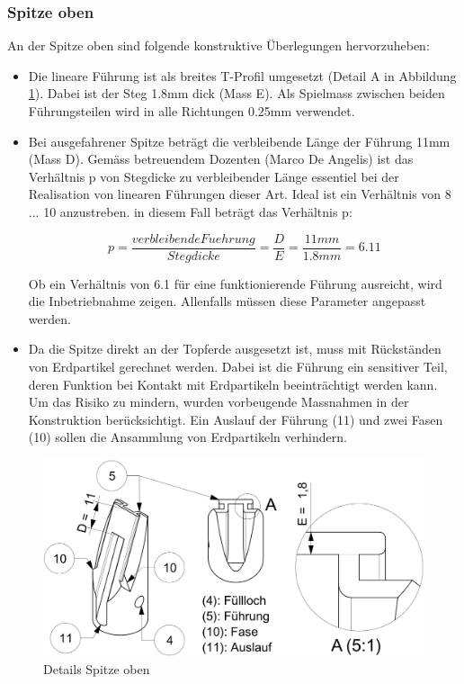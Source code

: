 \subsubsection{Spitze oben}
\label{spitzeoben}
An der Spitze oben sind folgende konstruktive Überlegungen hervorzuheben:
\begin{itemize}
	\item Die lineare Führung ist als breites T-Profil umgesetzt (Detail A in Abbildung \ref{fig:details_spitze_oben}). Dabei ist der Steg 1.8mm dick (Mass E). Als Spielmass zwischen beiden Führungsteilen wird in alle Richtungen 0.25mm verwendet.
	
	\item Bei ausgefahrener Spitze beträgt die verbleibende Länge der Führung 11mm (Mass D). Gemäss betreuendem Dozenten (Marco De Angelis) ist das Verhältnis p von Stegdicke zu verbleibender Länge essentiel bei der Realisation von linearen Führungen dieser Art. Ideal ist ein Verhältnis von 8 ... 10 anzustreben. in diesem Fall beträgt das Verhältnis p:
	
	\begin{equation}
	p=\frac{verbleibende Fuehrung}{Stegdicke}=\frac{D}{E}=\frac{11mm}{1.8mm}=6.11
	\end{equation}
		
	Ob ein Verhältnis von 6.1 für eine funktionierende Führung ausreicht, wird die Inbetriebnahme zeigen. Allenfalls müssen diese Parameter angepasst werden.
	
	\item Da die Spitze direkt an der Topferde ausgesetzt ist, muss mit Rückständen von Erdpartikel gerechnet werden. Dabei ist die Führung ein sensitiver Teil, deren Funktion bei Kontakt mit Erdpartikeln beeinträchtigt werden kann. Um das Risiko zu mindern, wurden vorbeugende Massnahmen in der Konstruktion berücksichtigt. Ein Auslauf der Führung (11) und zwei Fasen (10) sollen die Ansammlung von Erdpartikeln verhindern.
	\end{itemize}
	\begin{figure}[H]
	\includegraphics[scale=1.0]{Illustrationen/6-Umsetzung/details_spitze_oben.jpg}
	\caption{Details Spitze oben}
	\label{fig:details_spitze_oben}
	\end{figure}

